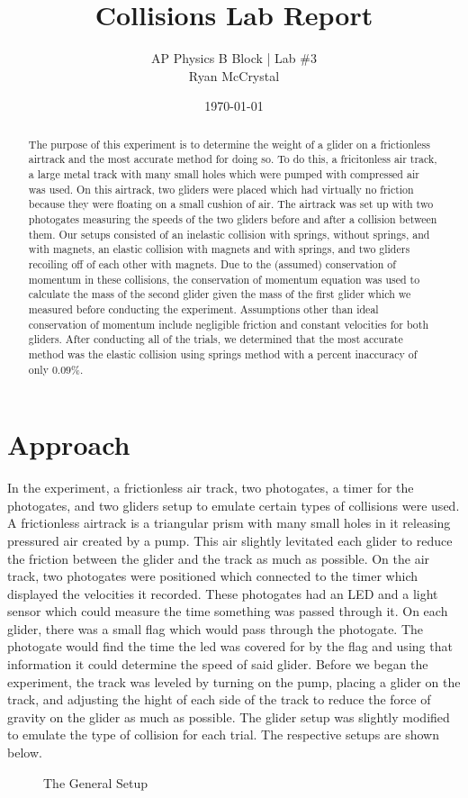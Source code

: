 \documentclass[12pt]{article}
\title{Collisions Lab Report}
\author{AP Physics B Block | Lab \#3\\Ryan McCrystal}
\date{\today}
\begin{document}
\maketitle
\newpage
\singlespacing
\tableofcontents
\doublespacing
\newpage

\begin{abstract}
	The purpose of this experiment is to determine the weight of a glider on a frictionless airtrack and the most accurate method for doing so. To do this, a fricitonless air track, a large metal track with many small holes which were pumped with compressed air was used. On this airtrack, two gliders were placed which had virtually no friction because they were floating on a small cushion of air. The airtrack was set up with two photogates measuring the speeds of the two gliders before and after a collision between them. Our setups consisted of an inelastic collision with springs, without springs, and with magnets, an elastic collision with magnets and with springs, and two gliders recoiling off of each other with magnets. Due to the (assumed) conservation of momentum in these collisions, the conservation of momentum equation was used to calculate the mass of the second glider given the mass of the first glider which we measured before conducting the experiment. Assumptions other than ideal conservation of momentum include negligible friction and constant velocities for both gliders. After conducting all of the trials, we determined that the most accurate method was the elastic collision using springs method with a percent inaccuracy of only $0.09\%$. %
\end{abstract}
\newpage

\section{Approach}
In the experiment, a frictionless air track, two photogates, a timer for the photogates, and two gliders setup to emulate certain types of collisions were used. A frictionless airtrack is a triangular prism with many small holes in it releasing pressured air created by a pump. This air slightly levitated each glider to reduce the friction between the glider and the track as much as possible. On the air track, two photogates were positioned which connected to the timer which displayed the velocities it recorded. These photogates had an LED and a light sensor which could measure the time something was passed through it. On each glider, there was a small flag which would pass through the photogate. The photogate would find the time the led was covered for by the flag and using that information it could determine the speed of said glider. Before we began the experiment, the track was leveled by turning on the pump, placing a glider on the track, and adjusting the hight of each side of the track to reduce the force of gravity on the glider as much as possible. The glider setup was slightly modified to emulate the type of collision for each trial. The respective setups are shown below.
\begin{figure}[H]
	\centering
	\caption{The General Setup}
\end{figure}
\end{document}
